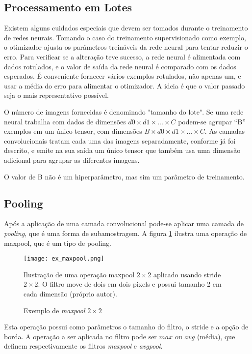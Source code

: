 \subsection{Processamento em Lotes}
Existem alguns cuidados especiais que devem ser tomados durante o treinamento de
redes neurais. Tomando o caso do treinamento supervisionado como exemplo, o
otimizador ajusta os parâmetros treináveis da rede neural para tentar reduzir o
erro. Para verificar se a alteração teve sucesso, a rede neural é
alimentada com
dados rotulados, e o valor de saída da rede neural é comparado com os dados
esperados. É conveniente fornecer vários exemplos rotulados, não apenas um, e
usar a média do erro para alimentar o otimizador. A ideia é que o valor passado
seja o mais representativo possível.

O número de imagens fornecidas é denominado "tamanho do lote". Se uma rede
neural trabalha com dados de dimensões $d0 \times d1 \times ... \times C$
podem-se agrupar “B” exemplos em
um único tensor, com dimensões $B \times d0 \times d1 \times ... \times C$.
As camadas convolucionais tratam cada
uma das imagens separadamente, conforme já foi descrito, e emite na sua saída um
único tensor que também usa uma dimensão adicional para agrupar as diferentes
imagens.

O valor de B não é um hiperparâmetro, mas sim um parâmetro de treinamento.

\subsection{Pooling}
Após a aplicação de uma camada convolucional pode-se aplicar uma camada de
\emph{pooling}, que é uma forma de subamostragem. A figura
\ref{fig:ex_maxpool} ilustra uma operação de maxpool, que é um tipo de
pooling.

\begin{figure}[!htb]
	\centering
	\texttt{[image: ex\_maxpool.png]}
	\caption{Exemplo de \emph{maxpool} $2 \times 2$}
	\label{fig:ex_maxpool}
	Ilustração de uma operação maxpool $2 \times 2$ aplicado usando stride
	$2 \times 2$. O filtro move de dois em dois pixels e possui
	tamanho 2 em cada dimensão (próprio autor).
\end{figure}

Esta operação possui como parâmetros o tamanho do filtro, o stride e a opção de
borda. A operação a ser aplicada no filtro pode ser $max$ ou $avg$ (média),
que definem respectivamente os filtros \emph{maxpool} e \emph{avgpool}.

